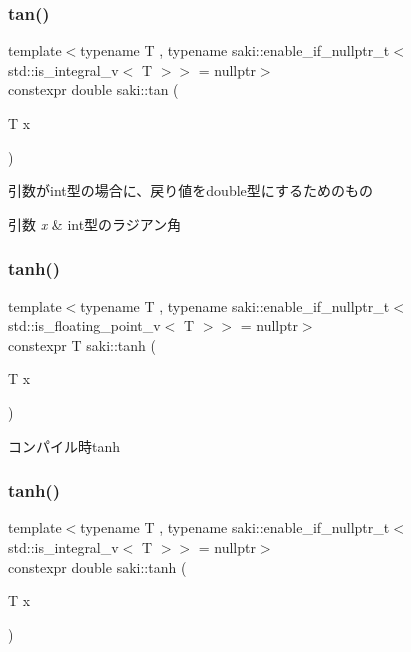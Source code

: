 \subsubsection{\texorpdfstring{tan()}{tan()}\hspace{0.1cm}{\footnotesize\ttfamily [2/2]}}
{\footnotesize\ttfamily template$<$typename T , typename saki\+::enable\+\_\+if\+\_\+nullptr\+\_\+t$<$ std\+::is\+\_\+integral\+\_\+v$<$ T $>$$>$  = nullptr$>$ \\
constexpr double saki\+::tan (\begin{DoxyParamCaption}\item[{T}]{x }\end{DoxyParamCaption})}



引数がint型の場合に、戻り値をdouble型にするためのもの 


\begin{DoxyParams}{引数}
{\em x} & int型のラジアン角 \\
\hline
\end{DoxyParams}
\mbox{\label{namespacesaki_af2674216630169ce211f8076492ce14e}} 
\subsubsection{\texorpdfstring{tanh()}{tanh()}\hspace{0.1cm}{\footnotesize\ttfamily [1/2]}}
{\footnotesize\ttfamily template$<$typename T , typename saki\+::enable\+\_\+if\+\_\+nullptr\+\_\+t$<$ std\+::is\+\_\+floating\+\_\+point\+\_\+v$<$ T $>$$>$  = nullptr$>$ \\
constexpr T saki\+::tanh (\begin{DoxyParamCaption}\item[{T}]{x }\end{DoxyParamCaption})}



コンパイル時tanh 

\mbox{\label{namespacesaki_a5faf83bc9a4a7e981275deba551d2f3f}} 
\subsubsection{\texorpdfstring{tanh()}{tanh()}\hspace{0.1cm}{\footnotesize\ttfamily [2/2]}}
{\footnotesize\ttfamily template$<$typename T , typename saki\+::enable\+\_\+if\+\_\+nullptr\+\_\+t$<$ std\+::is\+\_\+integral\+\_\+v$<$ T $>$$>$  = nullptr$>$ \\
constexpr double saki\+::tanh (\begin{DoxyParamCaption}\item[{T}]{x }\end{DoxyParamCaption})}




